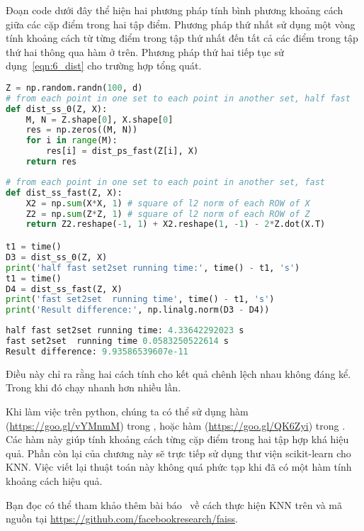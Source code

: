 Đoạn code dưới đây thể hiện hai phương pháp tính bình phương khoảng cách giữa
các cặp điểm trong hai tập điểm. Phương pháp thứ nhất sử dụng một vòng
 tính khoảng cách từ từng điểm trong tập thứ nhất đến tất cả
các điểm trong tập thứ hai thông qua hàm
 ở trên. Phương pháp thứ hai tiếp tục sử
dụng~\eqref{eqn:6_dist} cho trường hợp tổng quát.


\begin{lstlisting}[language=Python]
Z = np.random.randn(100, d)
# from each point in one set to each point in another set, half fast 
def dist_ss_0(Z, X):
    M, N = Z.shape[0], X.shape[0]
    res = np.zeros((M, N))
    for i in range(M):
        res[i] = dist_ps_fast(Z[i], X)
    return res 
\end{lstlisting}
\begin{lstlisting}[language=Python]
# from each point in one set to each point in another set, fast 
def dist_ss_fast(Z, X):
    X2 = np.sum(X*X, 1) # square of l2 norm of each ROW of X
    Z2 = np.sum(Z*Z, 1) # square of l2 norm of each ROW of Z
    return Z2.reshape(-1, 1) + X2.reshape(1, -1) - 2*Z.dot(X.T)

t1 = time() 
D3 = dist_ss_0(Z, X)
print('half fast set2set running time:', time() - t1, 's')
t1 = time() 
D4 = dist_ss_fast(Z, X)
print('fast set2set  running time', time() - t1, 's')
print('Result difference:', np.linalg.norm(D3 - D4))
\end{lstlisting}
\kq
\begin{lstlisting}[language=Python]
half fast set2set running time: 4.33642292023 s
fast set2set  running time 0.0583250522614 s
Result difference: 9.93586539607e-11
\end{lstlisting}
Điều này chỉ ra rằng hai cách tính cho kết quả chênh lệch nhau không đáng kể.
Trong khi đó  chạy nhanh hơn
 nhiều lần. 

Khi làm việc trên python, chúng ta có thể sử dụng hàm
 (\url{https://goo.gl/vYMnmM}) trong
, hoặc hàm
 (\url{https://goo.gl/QK6Zyi}) trong
. Các hàm này giúp tính khoảng cách từng 
cặp điểm trong hai tập hợp khá hiệu quả. Phần còn lại của chương này sẽ trực
tiếp sử dụng thư viện scikit-learn cho KNN. Việc viết lại thuật toán này không
quá phức tạp khi đã có một hàm tính khoảng cách hiệu quả. 

Bạn đọc có thể tham khảo thêm bài báo~\cite{johnson2017billion} về cách thực
hiện KNN trên  và mã nguồn tại
\url{https://github.com/facebookresearch/faiss}.




